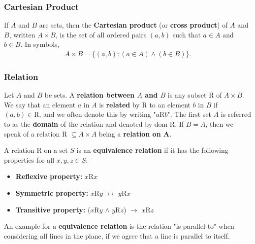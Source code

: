 \newpage
\subsubsection{Cartesian Product}
\begin{definition}
	If $A$ and $B$ are sets, then the \textbf{Cartesian product} (or \textbf{cross product}) of $A$ and $B$, written $A\times B$, is the set of all ordered pairs $(a,b)$ such that $a\in A$ and $b\in B$. In symbols,
	\begin{align*}
		A\times B = \{(a,b):(a\in A) \land (b\in B)\}.
	\end{align*}
\end{definition}

\newpage
\subsubsection{Relation}
\begin{definition}[Relation]
	Let $A$ and $B$ be sets. A \textbf{relation between $A$ and $B$} is any subset R of $A\times B$. We say that an element $a$ in $A$ is \textbf{related} by R to an element $b$ in $B$ if $(a,b)\in \text{R}$, and we often denote this by writing "$a\text{R}b$". The first set $A$ is referred to as the \textbf{domain} of the relation and denoted by dom R. If $B=A$, then we speak of a relation R $\subseteq A\times A$ being a \textbf{relation on A}.
\end{definition}

\begin{definition}
	A relation R on a set $S$ is an \textbf{equivalence relation} if it has the following properties for all $x,y,z \in S$:
	\begin{itemize}
		\item \textbf{Reflexive property:} $x$R$x$
		\item \textbf{Symmetric property:} $x$R$y$ $\leftrightarrow$ $y$R$x$
		\item \textbf{Transitive property:} ($x$R$y$ $\land$ $y$R$z$) $\rightarrow$ $x$R$z$
	\end{itemize}
\end{definition}

An example for a \textbf{equivalence relation} is the relation "is parallel to" when considering all lines in the plane, if we agree that a line is parallel to itself.

